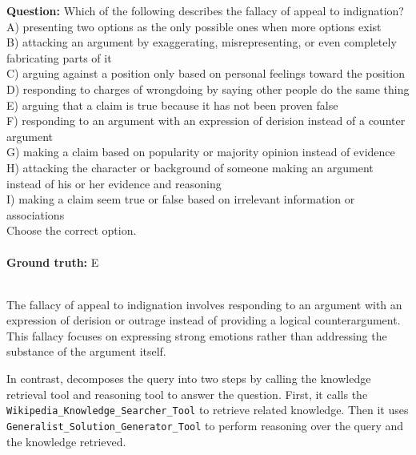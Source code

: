 
\begin{querybox}
    \textbf{Question:} Which of the following describes the fallacy of appeal to indignation?\\
    A) presenting two options as the only possible ones when more options exist \\
    B) attacking an argument by exaggerating, misrepresenting, or even completely fabricating parts of it\\
    C) arguing against a position only based on personal feelings toward the position\\
    D) responding to charges of wrongdoing by saying other people do the same thing\\
    E) arguing that a claim is true because it has not been proven false\\
    F) responding to an argument with an expression of derision instead of a counter argument\\
    G) making a claim based on popularity or majority opinion instead of evidence\\
    H) attacking the character or background of someone making an argument instead of his or her evidence and reasoning\\
    I) making a claim seem true or false based on irrelevant information or associations\\   
    Choose the correct option.
    \\\\
    \textbf{Ground truth:} E
\end{querybox}




\begin{querybox}
\\
The fallacy of appeal to indignation involves responding to an argument with an expression of derision or outrage instead of providing a logical counterargument. This fallacy focuses on expressing strong emotions rather than addressing the substance of the argument itself.
\end{querybox}

In contrast, \model decomposes the query into two steps by calling the knowledge retrieval tool and reasoning tool to answer the question.  First, it calls the \texttt{Wikipedia\_Knowledge\_Searcher\_Tool} to retrieve related knowledge. Then it uses \texttt{Generalist\_Solution\_Generator\_Tool} to perform reasoning over the query and the knowledge retrieved.  

